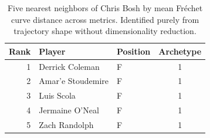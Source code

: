 \begin{table}[htbp]
  \centering\small
  \begin{tabular}{rllc}
    \toprule
    Rank & Player & Position & Archetype \\
    \midrule
    1 & Derrick Coleman & F & 1 \\
    2 & Amar'e Stoudemire & F & 1 \\
    3 & Luis Scola & F & 1 \\
    4 & Jermaine O'Neal & F & 1 \\
    5 & Zach Randolph & F & 1 \\
    \bottomrule
  \end{tabular}
  \caption{Five nearest neighbors of Chris Bosh by mean Fr\'{e}chet curve distance across metrics. Identified purely from trajectory shape without dimensionality reduction.}
  \label{tab:Chris_Bosh_frechet_curve_neighbors}
\end{table}

